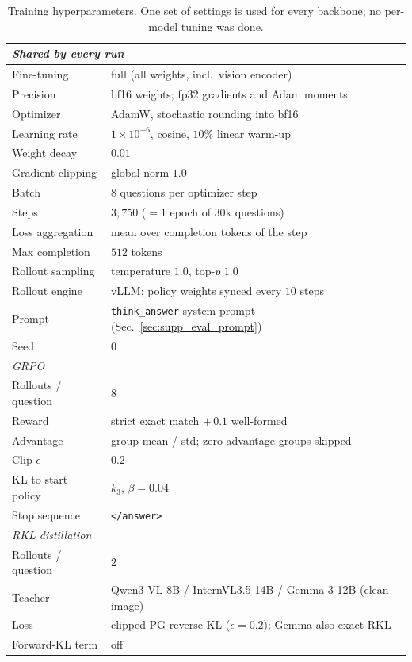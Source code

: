 \begin{table}[t]
\centering\small
\setlength{\tabcolsep}{5pt}
\begin{tabular}{ll}
\toprule
\multicolumn{2}{l}{\emph{Shared by every run}} \\
\midrule
Fine-tuning          & full (all weights, incl.\ vision encoder) \\
Precision            & bf16 weights; fp32 gradients and Adam moments \\
Optimizer            & AdamW, stochastic rounding into bf16 \\
Learning rate        & $1\times10^{-6}$, cosine, $10\%$ linear warm-up \\
Weight decay         & $0.01$ \\
Gradient clipping    & global norm $1.0$ \\
Batch                & $8$ questions per optimizer step \\
Steps                & $3{,}750$ ($=1$ epoch of $30$k questions) \\
Loss aggregation     & mean over completion tokens of the step \\
Max completion       & $512$ tokens \\
Rollout sampling     & temperature $1.0$, top-$p$ $1.0$ \\
Rollout engine       & vLLM; policy weights synced every $10$ steps \\
Prompt               & \texttt{think\_answer} system prompt (Sec.~\ref{sec:supp_eval_prompt}) \\
Seed                 & $0$ \\
\midrule
\multicolumn{2}{l}{\emph{GRPO}} \\
\midrule
Rollouts / question  & $8$ \\
Reward               & strict exact match $+\,0.1$ well-formed \\
Advantage            & group mean / std; zero-advantage groups skipped \\
Clip $\epsilon$      & $0.2$ \\
KL to start policy   & $k_3$, $\beta=0.04$ \\
Stop sequence        & \texttt{</answer>} \\
\midrule
\multicolumn{2}{l}{\emph{RKL distillation}} \\
\midrule
Rollouts / question  & $2$ \\
Teacher              & Qwen3-VL-8B / InternVL3.5-14B / Gemma-3-12B (clean image) \\
Loss                 & clipped PG reverse KL ($\epsilon=0.2$); Gemma also exact RKL \\
Forward-KL term      & off \\
\bottomrule
\end{tabular}
\caption{Training hyperparameters. One set of settings is used for every backbone; no
per-model tuning was done.}
\label{tab:supp_train_hparams}
\end{table}

